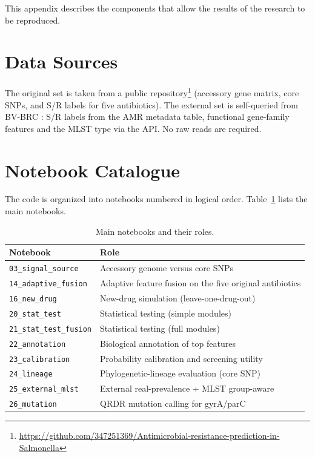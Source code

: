 \documentclass[../main.tex]{subfiles}
\begin{document}
This appendix describes the components that allow the results of the research to be reproduced.

\section{Data Sources}

The original set is taken from a public repository\footnote{\url{https://github.com/347251369/Antimicrobial-resistance-prediction-in-Salmonella}} (accessory gene matrix, core SNPs, and S/R labels for five antibiotics). The external set is self-queried from BV-BRC \cite{olson2023bvbrc}: S/R labels from the AMR metadata table, functional gene-family features and the MLST type via the API. No raw reads are required.

\section{Notebook Catalogue}

The code is organized into notebooks numbered in logical order. Table~\ref{tab:notebooks} lists the main notebooks.

\begin{table}[H]
\centering
\caption{Main notebooks and their roles.}
\label{tab:notebooks}
\begin{tabular}{ll}
\hline
Notebook & Role \\ \hline
\texttt{03\_signal\_source} & Accessory genome versus core SNPs \\
\texttt{14\_adaptive\_fusion} & Adaptive feature fusion on the five original antibiotics \\
\texttt{16\_new\_drug} & New-drug simulation (leave-one-drug-out) \\
\texttt{20\_stat\_test} & Statistical testing (simple modules) \\
\texttt{21\_stat\_test\_fusion} & Statistical testing (full modules) \\
\texttt{22\_annotation} & Biological annotation of top features \\
\texttt{23\_calibration} & Probability calibration and screening utility \\
\texttt{24\_lineage} & Phylogenetic-lineage evaluation (core SNP) \\
\texttt{25\_external\_mlst} & External real-prevalence + MLST group-aware \\
\texttt{26\_mutation} & QRDR mutation calling for gyrA/parC \\ \hline
\end{tabular}
\end{table}
\end{document}
